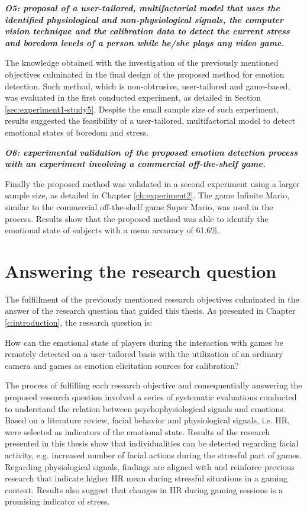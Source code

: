 \textit{\textbf{O5: proposal of a user-tailored, multifactorial model that uses the identified physiological and non-physiological signals, the computer vision technique and the calibration data to detect the current stress and boredom levels of a person while he/she plays any video game.}}

The knowledge obtained with the investigation of the previously mentioned objectives culminated in the final design of the proposed method for emotion detection. Such method, which is non-obtrusive, user-tailored and game-based, was evaluated in the first conducted experiment, as detailed in Section \ref{sec:experiment1-study5}. Despite the small sample size of such experiment, results suggested the feasibility of a user-tailored, multifactorial model to detect emotional states of boredom and stress.

\textit{\textbf{O6: experimental validation of the proposed emotion detection process with an experiment involving a commercial off-the-shelf game.}}

Finally the proposed method was validated in a second experiment using a larger sample size, as detailed in Chapter \ref{ch:experiment2}. The game Infinite Mario, similar to the commercial off-the-shelf game Super Mario, was used in the process. Results show that the proposed method was able to identify the emotional state of subjects with a mean accuracy of 61.6\%.

\section{Answering the research question}

The fulfillment of the previously mentioned research objectives culminated in the answer of the research question that guided this thesis. As presented in Chapter \ref{c:introduction}, the research question is:

\begin{fquote}
How can the emotional state of players during the interaction with games be remotely detected on a user-tailored basis with the utilization of an ordinary camera and games as emotion elicitation sources for calibration?
\end{fquote}

The process of fulfilling each research objective and consequentially answering the proposed research question involved a series of systematic evaluations conducted to understand the relation between psychophysiological signals and emotions. Based on a literature review, facial behavior and physiological signals, i.e. HR, were selected as indicators of the emotional state. Results of the research presented in this thesis show that individualities can be detected regarding facial activity, e.g. increased number of facial actions during the stressful part of games. Regarding physiological signals, findings are aligned with and reinforce previous research that indicate higher HR mean during stressful situations in a gaming context. Results also suggest that changes in HR during gaming sessions is a promising indicator of stress.

